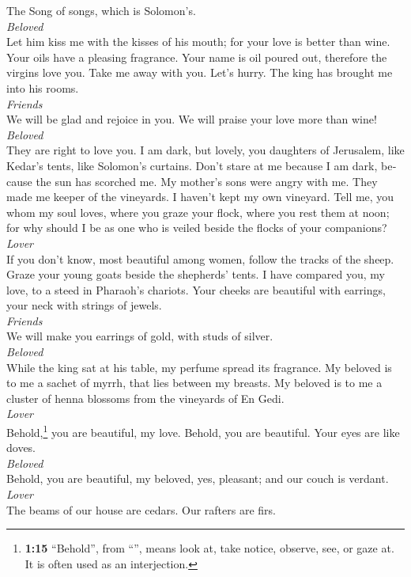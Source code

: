 \begin{paracol}{2}
\begin{otherlanguage}{english}
 The Song of songs, which is Solomon's.\\
\emph{Beloved }\\
 Let him kiss me with the kisses of his mouth; for your
love is better than wine.  Your oils have a pleasing
fragrance. Your name is oil poured out, therefore the virgins love you.
 Take me away with you. Let's hurry. The king has brought
me into his rooms.\\
\emph{Friends }\\
We will be glad and rejoice in you. We will praise your love more than
wine!\\
\emph{Beloved }\\
They are right to love you.  I am dark, but lovely, you
daughters of Jerusalem, like Kedar's tents, like Solomon's curtains.
 Don't stare at me because I am dark, because the sun has
scorched me. My mother's sons were angry with me. They made me keeper of
the vineyards. I haven't kept my own vineyard.  Tell me,
you whom my soul loves, where you graze your flock, where you rest them
at noon; for why should I be as one who is veiled beside the flocks of
your companions?\\
\emph{Lover }\\
 If you don't know, most beautiful among women, follow the
tracks of the sheep. Graze your young goats beside the shepherds' tents.
 I have compared you, my love, to a steed in Pharaoh's
chariots.  Your cheeks are beautiful with earrings, your
neck with strings of jewels.\\
\emph{Friends }\\
 We will make you earrings of gold, with studs of
silver.\\
\emph{Beloved }\\
 While the king sat at his table, my perfume spread its
fragrance.  My beloved is to me a sachet of myrrh, that
lies between my breasts.  My beloved is to me a cluster
of henna blossoms from the vineyards of En Gedi.\\
\emph{Lover }\\
 Behold,\footnote{\textbf{1:15} ``Behold'', from
  ``'', means look at, take notice, observe, see, or gaze
  at. It is often used as an interjection.} you are beautiful, my love.
Behold, you are beautiful. Your eyes are like doves.\\
\emph{Beloved }\\
 Behold, you are beautiful, my beloved, yes, pleasant;
and our couch is verdant.\\
\emph{Lover }\\
 The beams of our house are cedars. Our rafters are firs.


\end{otherlanguage}
\end{paracol}
